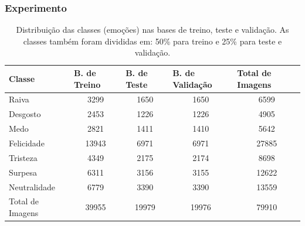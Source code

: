 \documentclass{beamer}
\begin{document}
\begin{frame}
\frametitle{Experimento}
\begin{table}[]
\tiny
\centering
\caption{Distribuição das classes (emoções) nas bases de treino, teste e validação. As classes também foram divididas em: 50\% para treino e 25\% para teste e validação.}
\label{table:distclasse}
\begin{tabular}{lcccc}
\hline
\textbf{Classe}  & \multicolumn{1}{l}{\textbf{B. de Treino}} & \multicolumn{1}{l}{\textbf{B. de Teste}} & \multicolumn{1}{l}{\textbf{B. de Validação}} & \multicolumn{1}{l}{\textbf{Total de Imagens}} \\ \hline
Raiva            & 3299                                        & 1650                                       & 1650                                           & 6599                                          \\
Desgosto         & 2453                                        & 1226                                       & 1226                                           & 4905                                          \\
Medo             & 2821                                        & 1411                                       & 1410                                           & 5642                                          \\
Felicidade       & 13943                                       & 6971                                       & 6971                                           & 27885                                         \\
Tristeza         & 4349                                        & 2175                                       & 2174                                           & 8698                                          \\
Surpesa          & 6311                                        & 3156                                       & 3155                                           & 12622                                         \\
Neutralidade     & 6779                                        & 3390                                       & 3390                                           & 13559                                         \\
Total de Imagens & 39955                                       & 19979                                      & 19976                                          & 79910                                         \\ \hline
\end{tabular}
\end{table}
\end{frame}
\end{document}
